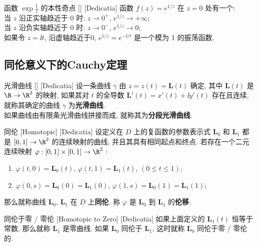 \documentclass[UTF8]{ctexart}
\begin{document}
        \begin{xmp}
            [UUID]
            {函数 \(\exp\frac{1}{z}\) 的本性奇点}
            []
            [Dedicatia]
            函数 \(f(z) = e^{1/z}\) 在 \(z=0\) 处有一个\EssentialSingularity :\\
            当 \(z\) 沿正实轴趋近于 0 时: \(z \to 0^+\), \(e^{1/z} \to +\infty\);\\ 
            当 \(z\) 沿负实轴趋近于 0 时: \(z \to 0^-\), \(e^{1/z} \to 0\);\\
            如果令 \(z =\ii t\), 沿虚轴趋近于0, \(e^{1/z} = e^{-\ii/t}\) 是一个模为 1 的振荡函数.
        \end{xmp}

    \subsection{同伦意义下的Cauchy定理}

        \begin{dfn}
            [UUID]
            {光滑曲线}
            []
            [Dedicatia]
            设一条曲线 \(\gamma\) 由 \(z=z(t)=\bm{L}(t)\) 确定, 其中 \(\bm{L}(t)\) 是 \(\R\to\R^2\) 的映射, 如果其对 \(t\) 的全导数 \(\bm{L}'(t)=x'(t)+\ii y'(t)\) 存在且连续, 就称其确定的曲线 \(\gamma\) 为\textbf{光滑曲线}. \\
            如果曲线由有限条光滑曲线拼接而成, 就称其为\textbf{分段光滑曲线}. 
        \end{dfn}

        \begin{dfn}
            [UUID]
            {同伦}
            [Homotopic]
            [Dedicatia]
            设定义在 \(D\) 上的复函数的参数表示式 \(\bm{L}_0\) 和 \(\bm{L}_1\) 都是 \([0,1]\to\R^2\) 的连续映射的曲线, 并且其具有相同起点和终点. 若存在一个二元连续映射 \(\varphi:[0,1]\times[0,1]\to\R^2\) :
            \begin{enumerate}
                \item  \(\varphi(t,0)=\bm{L}_0(t)\),  \(\varphi(t,1)=\bm{L}_1(t)\),  \((0\leq t\leq 1)\);
                \item  \(\varphi(0,s)=\bm{L}_0(0)=\bm{L}_1(0)\),  \(\varphi(1,s)=\bm{L}_0(1)=\bm{L}_1(1)\);
            \end{enumerate}
            那么就称曲线 \(\bm{L}_0\),  \(\bm{L}_1\) 在 \(D\) 上\textbf{同伦}. 称 \(\varphi\) 是 \(\bm{L}_0\) 到 \(\bm{L}_1\) 的\textbf{伦移}. 
        \end{dfn}

        \begin{dfn}
            [UUID]
            {同伦于零 / 零伦}
            [Homotopic to Zero]
            [Dedicatia]
            如果上面定义的 \(\bm{L}_1(t)\) 恒等于常数, 那么就称 \(\bm{L}_1\) 是零曲线. 如果 \(\bm{L}_0\) 同伦于 \(\bm{L}_1\), 这时就称 \(\bm{L}_0\) 同伦于零 / 零伦的. 
        \end{dfn}
\end{document}

